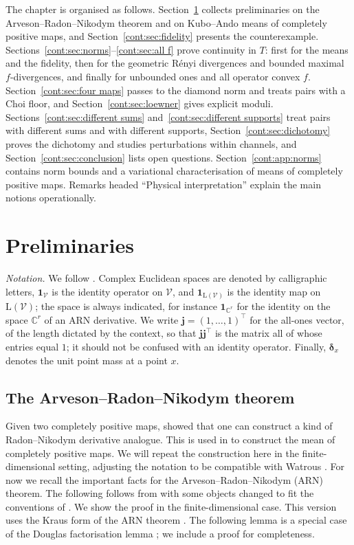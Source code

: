 The chapter is organised as follows. Section~\ref{cont:sec:prelim} collects preliminaries on the Arveson--Radon--Nikodym theorem and on Kubo--Ando means of completely positive maps, and Section~\ref{cont:sec:fidelity} presents the counterexample. Sections~\ref{cont:sec:norms}--\ref{cont:sec:all f} prove continuity in $T$: first for the means and the fidelity, then for the geometric R\'enyi divergences and bounded maximal $f$-divergences, and finally for unbounded ones and all operator convex $f$. Section~\ref{cont:sec:four maps} passes to the diamond norm and treats pairs with a Choi floor, and Section~\ref{cont:sec:loewner} gives explicit moduli. Sections~\ref{cont:sec:different sums} and~\ref{cont:sec:different supports} treat pairs with different sums and with different supports, Section~\ref{cont:sec:dichotomy} proves the dichotomy and studies perturbations within channels, and Section~\ref{cont:sec:conclusion} lists open questions. Section~\ref{cont:app:norms} contains norm bounds and a variational characterisation of means of completely positive maps. Remarks headed ``Physical interpretation'' explain the main notions operationally.

\section{Preliminaries}\label{cont:sec:prelim}
\emph{Notation.} We follow \cite{watrous2018theory}. Complex Euclidean spaces are denoted by calligraphic letters, $\mathbf{1}_{\mathcal{V}}$ is the identity operator on $\mathcal{V}$, and $\mathbf{1}_{\mathrm{L}(\mathcal{V})}$ is the identity map on $\mathrm{L}(\mathcal{V})$; the space is always indicated, for instance $\mathbf{1}_{\mathbb{C}^r}$ for the identity on the space $\mathbb{C}^r$ of an ARN derivative. We write $\mathbf{j}=(1,\dots,1)^\top$ for the all-ones vector, of the length dictated by the context, so that $\mathbf{j}\mathbf{j}^\top$ is the matrix all of whose entries equal $1$; it should not be confused with an identity operator. Finally, $\boldsymbol{\delta}_x$ denotes the unit point mass at a point $x$.

\subsection{The Arveson--Radon--Nikodym theorem}
Given two completely positive maps, \cite{arveson1969subalgebras} showed that one can construct a kind of Radon--Nikodym derivative analogue. This is used in \cite{kian2026relative} to construct the mean of completely positive maps. We will repeat the construction here in the finite-dimensional setting, adjusting the notation to be compatible with Watrous \cite{watrous2018theory}. For now we recall the important facts for the Arveson--Radon--Nikodym (ARN) theorem. The following follows from \cite{arveson1969subalgebras} with some objects changed to fit the conventions of \cite{kian2026relative}. We show the proof in the finite-dimensional case. This version uses the Kraus form of the ARN theorem \cite{Raginsky2003}. The following lemma is a special case of the Douglas factorisation lemma \cite{Douglas1966}; we include a proof for completeness.
 
